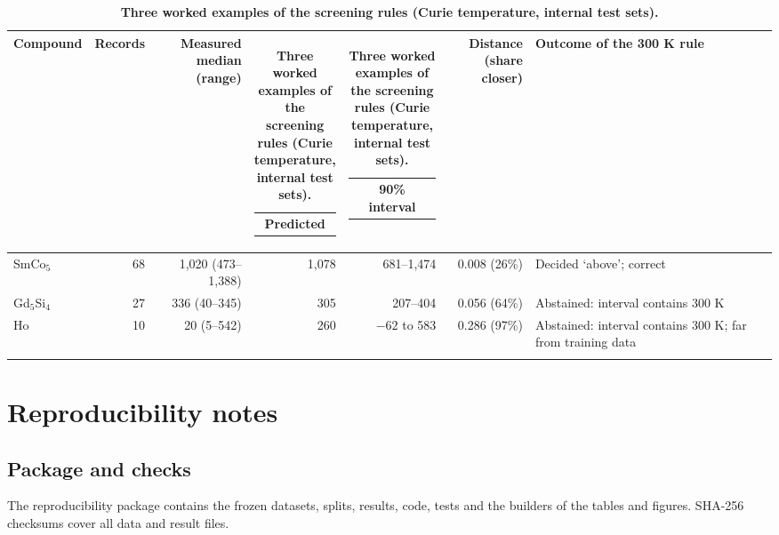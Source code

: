 \documentclass[pdflatex,sn-nature]{sn-jnl}
\makeatletter
\newcommand{\hd}[1]{\begin{tabular}[b]{@{}c@{}}#1\end{tabular}}
\makeatother
\begin{document}
\begin{table}[!ht]
\caption{\textbf{Three worked examples of the screening rules (Curie temperature, internal test sets).}}\label{tab:s24}%
\setlength{\tabcolsep}{3pt}%
\begin{tabular*}{\textwidth}{@{\extracolsep\fill}lrrrrr>{\raggedright\arraybackslash}p{66pt}@{}}
\toprule
Compound & Records & \hd{Measured\\median (range)} & \hd{Predicted} & \hd{90\% interval} & \hd{Distance\\(share closer)} & Outcome of the 300 K rule \\
\midrule
SmCo$_5$ & 68 & 1,020 (473--1,388) & 1,078 & 681--1,474 & 0.008 (26\%) & Decided `above'; correct \\
Gd$_5$Si$_4$ & 27 & 336 (40--345) & 305 & 207--404 & 0.056 (64\%) & Abstained: interval contains 300 K \\
Ho & 10 & 20 (5--542) & 260 & $-62$ to 583 & 0.286 (97\%) & Abstained: interval contains 300 K; far from training data \\
\botrule
\end{tabular*}
\end{table}

\clearpage
\section{Reproducibility notes}

\subsection{Package and checks}
The reproducibility package contains the frozen datasets, splits, results, code, tests and the builders of the tables and figures. SHA-256 checksums cover all data and result files.
\end{document}
